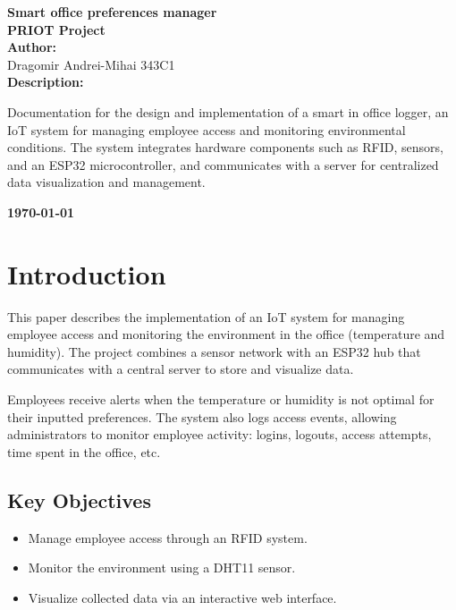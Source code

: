 \documentclass[a4paper,12pt]{report}
\begin{document}
\begin{titlepage}
    \centering
    \vspace*{1.5cm}
    
    {\Huge \textbf{Smart office preferences manager}} \\[1.5cm]
    
    {\Large \textbf{PRIOT Project}} \\[2.5cm]
    
    \textbf{Author:} \\[0.5cm]
    {\Large Dragomir Andrei-Mihai 343C1} \\[2.5cm]
    
    \textbf{Description:} \\[0.5cm]
    \parbox{0.8\textwidth}{
        Documentation for the design and implementation of a smart in office logger,
        an IoT system for managing employee access and monitoring environmental conditions. The system integrates hardware components such as RFID, sensors, and an ESP32 microcontroller, and communicates with a server for centralized data visualization and management.
    }
    
    \vfill
    {\Large \textbf{\today}} \\[1.5cm]
\end{titlepage}

\newpage
\tableofcontents
\newpage

\chapter{Introduction}

This paper describes the implementation of an IoT system for managing employee access and monitoring the environment in the office (temperature and humidity). The project combines a sensor network with an ESP32 hub that communicates with a central server to store and visualize data.

Employees receive alerts when the temperature or humidity is not optimal for their inputted preferences. The system also logs access events, allowing administrators to monitor employee activity: logins, logouts, access attempts, time spent in the office, etc.

\section{Key Objectives}
\begin{itemize}
    \item Manage employee access through an RFID system.
    \item Monitor the environment using a DHT11 sensor.
    \item Visualize collected data via an interactive web interface.
\end{itemize}
\end{document}
